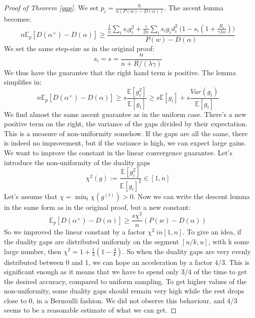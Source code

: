 \documentclass{article}
\DeclareMathOperator{\1}{\mathbb{1}}
\begin{document}
\begin{proof}[Proof of Theorem \ref{gap}]
	We set $p_i= \frac{g_i}{n(P(w)-D(\alpha))}$. The ascent lemma becomes:
	\begin{equation}
		n \mathbb E_p[D(\alpha^+) - D(\alpha)] 
		\geq \frac{ \frac{1}{n}\sum_i s_i g_i^2 
		+ \frac{\gamma}{2 n}  \sum_i s_i  g_i d_i^2 \ 
		\bigg ( 1 - s_i (1 + \frac{R_i}{\gamma \lambda n}) \bigg ) }{P(w) - D(\alpha)}
	\end{equation}
	We set the same step-size as in the original proof:  
	\begin{equation}
		s_i = s = \frac{n}{n+R/(\lambda \gamma)}	
	\end{equation} 
	We thus have the guarantee that the right hand term is positive. The lemma simplifies in:
	\begin{equation}
		n \mathbb E_p[D(\alpha^+) - D(\alpha)] 
		\geq s \frac{\mathbb E[g_i^2]}{\mathbb E[g_i]} 
		\geq s \mathbb E[g_i] + s \frac{Var(g_i)}{\mathbb E[g_i]}
	\end{equation}
	We find almost the same ascent guarantee as in the uniform case. 
	There's a new positive term on the right, the variance of the gaps divided by their expectation. 
	This is a measure of non-uniformity somehow. 
	If the gaps are all the same, there is indeed no improvement, but if the variance is high, we can expect large gains. 
	We want to improve the constant in the linear convergence guarantee. 
	Let's introduce the non-uniformity of the duality gaps 
	\begin{equation}
		\chi^2(g) := \frac{\mathbb E[g_i^2]}{\mathbb E[g_i]^2 } \in [1,n]
	\end{equation}
	Let's assume that $\chi = \min_t \chi(g^{(t)}) >0$. Now we can write the descent lemma in the same form as in the original proof, but a new constant:
	\begin{equation}
		\mathbb E_p[D(\alpha^+) - D(\alpha)] 
		\geq \frac{s \chi^2}{n} (P(w) - D(\alpha))
	\end{equation}
	So we improved the linear constant by a factor $\chi^2 \ in [1, n]$.	
	To give an idea, if the duality gaps are distributed uniformly on the segment $[u/k,u]$, with k some large number, then $\chi^2= 1 + \frac{1}{3}(1 - \frac{4}{k})$. 
	So when the duality gaps are very evenly distributed between 0 and 1, we can hope an acceleration by a factor $4/3$.
	This is significant enough as it means that we have to spend only $3/4$ of the time to get the desired accuracy, compared to uniform sampling. 
	To get higher values of the non-uniformity, some duality gaps should remain very high while the rest drops close to 0, in a Bernoulli fashion. 
	We did not observe this behaviour, and $4/3$ seems to be a reasonable estimate of what we can get. 
\end{proof}
\end{document}
